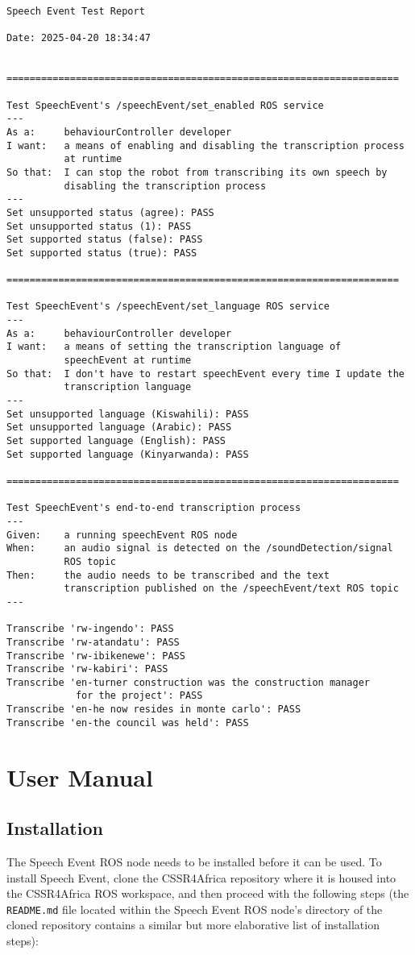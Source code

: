 \documentclass{CSSRforAfrica}
\begin{document}
\begin{verbatim}
Speech Event Test Report
    
Date: 2025-04-20 18:34:47
    
    
====================================================================
    
Test SpeechEvent's /speechEvent/set_enabled ROS service
---
As a:     behaviourController developer
I want:   a means of enabling and disabling the transcription process
          at runtime
So that:  I can stop the robot from transcribing its own speech by
          disabling the transcription process
---
Set unsupported status (agree): PASS
Set unsupported status (1): PASS
Set supported status (false): PASS
Set supported status (true): PASS

====================================================================

Test SpeechEvent's /speechEvent/set_language ROS service
---
As a:     behaviourController developer
I want:   a means of setting the transcription language of
          speechEvent at runtime
So that:  I don't have to restart speechEvent every time I update the
          transcription language
---
Set unsupported language (Kiswahili): PASS
Set unsupported language (Arabic): PASS
Set supported language (English): PASS
Set supported language (Kinyarwanda): PASS

====================================================================

Test SpeechEvent's end-to-end transcription process
---
Given:    a running speechEvent ROS node
When:     an audio signal is detected on the /soundDetection/signal
          ROS topic
Then:     the audio needs to be transcribed and the text
          transcription published on the /speechEvent/text ROS topic
---

Transcribe 'rw-ingendo': PASS
Transcribe 'rw-atandatu': PASS
Transcribe 'rw-ibikenewe': PASS
Transcribe 'rw-kabiri': PASS
Transcribe 'en-turner construction was the construction manager
            for the project': PASS
Transcribe 'en-he now resides in monte carlo': PASS
Transcribe 'en-the council was held': PASS
\end{verbatim}


\newpage
\section{User Manual}
\subsection{Installation}
The Speech Event ROS node needs to be installed before it can be used. To install Speech Event, clone the CSSR4Africa repository where it is housed into the CSSR4Africa ROS workspace, and then proceed with the following steps (the \texttt{README.md} file located within the Speech Event ROS node's directory of the cloned repository contains a similar but more elaborative list of installation steps):
\end{document}
